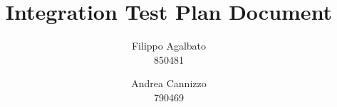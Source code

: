 \documentclass[a4paper]{report}
\begin{document}
\setcounter{tocdepth}{1}

\title{\Huge Integration Test Plan Document}
\author{Filippo Agalbato \\ 850481 \and Andrea Cannizzo \\ 790469}
\maketitle

\tableofcontents






\appendix

\end{document}
